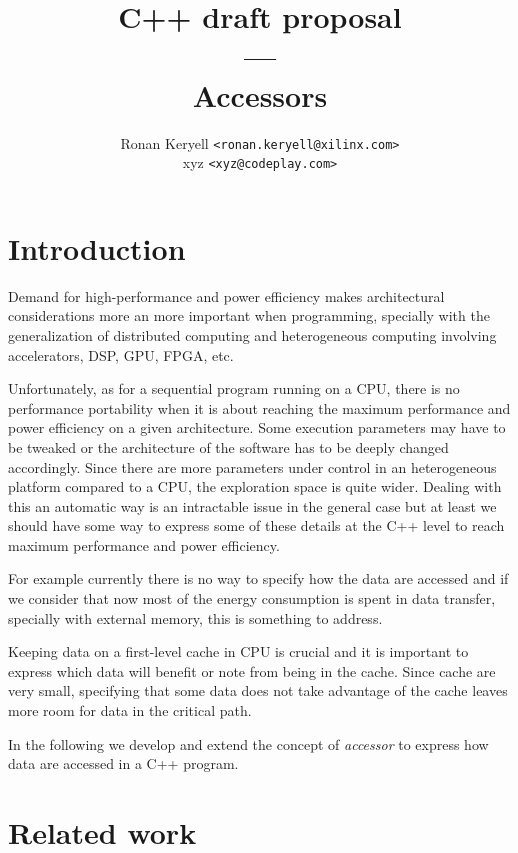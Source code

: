 \documentclass[a4paper]{article}
\title{C++ draft proposal\\
  ---\\
  Accessors}
\author{Ronan Keryell \texttt{<ronan.keryell@xilinx.com>}\\
  xyz \texttt{<xyz@codeplay.com>}}
\begin{document}
\maketitle

\tableofcontents

\section{Introduction}
\label{sec:introduction}

Demand for high-performance and power efficiency makes architectural
considerations more an more important when programming, specially with
the generalization of distributed computing and heterogeneous
computing involving accelerators, DSP, GPU, FPGA, etc.

Unfortunately, as for a sequential program running on a CPU, there is
no performance portability when it is about reaching the maximum
performance and power efficiency on a given architecture. Some
execution parameters may have to be tweaked or the architecture of the
software has to be deeply changed accordingly. Since there are more
parameters under control in an heterogeneous platform compared to a
CPU, the exploration space is quite wider. Dealing with
this an automatic way is an intractable issue in the general case but
at least we should have some way to express some of these details at
the C++ level to reach maximum performance and power efficiency.

For example currently there is no way to specify how the data are
accessed and if we consider that now most of the energy consumption is
spent in data transfer, specially with external memory, this is
something to address.

Keeping data on a first-level cache in CPU is crucial and it is
important to express which data will benefit or note from being in the
cache. Since cache are very small, specifying that some data does not
take advantage of the cache leaves more room for data in the critical
path.

In the following we develop and extend the concept of \emph{accessor}
to express how data are accessed in a C++ program.


\section{Related work}
\label{sec:related-work}
\end{document}
